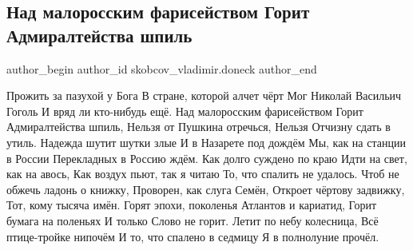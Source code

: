  
 
 
 
 
 
\subsection{Над малоросским фарисейством Горит Адмиралтейства шпиль}
\label{sec:27_09_2021.fb.skobcov_vladimir.doneck.1.gogol_rossia_poezia}
 
\ifcmt
 author_begin
   author_id skobcov_vladimir.doneck
 author_end
\fi

Прожить за пазухой у Бога
В стране, которой алчет чёрт
Мог Николай Васильич Гоголь
И вряд ли кто-нибудь ещё.
Над малоросским фарисейством
Горит Адмиралтейства шпиль,
Нельзя от Пушкина отречься,
Нельзя Отчизну сдать в утиль.
Надежда шутит шутки злые
И в Назарете под дождём
Мы, как на станции в России
Перекладных в Россию ждём.
Как долго суждено по краю
Идти на свет, как на авось,
Как воздух пьют, так я читаю
То, что спалить не удалось.
Чтоб не обжечь ладонь о книжку,
Проворен, как слуга Семён,
Откроет чёртову задвижку,
Тот, кому тысяча имён.
Горят эпохи, поколенья
Атлантов и кариатид,
Горит бумага на поленьях
И только Слово не горит.
Летит по небу колесница,
Всё птице-тройке нипочём 
И то, что спалено в седмицу
Я в полнолуние прочёл.
